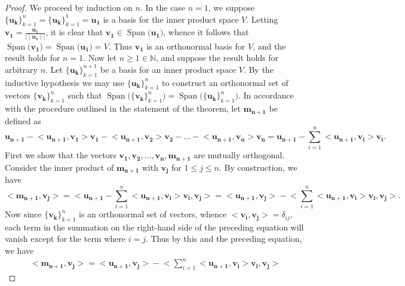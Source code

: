 \documentclass[12pt]{article}
\theoremstyle{plain}
\DeclareMathOperator{\spn}{Span}
\begin{document}
\begin{proof}
We proceed by induction on $n$. In the case $n=1$, we suppose 
$\{\mathbf{u_k}\}_{k=1}^n=\{\mathbf{u_k}\}_{k=1}^1=\mathbf{u_1}$ is a basis for the inner product space $V$. Letting $\mathbf{v_1}=\tfrac{\mathbf{u_1}}{\mid\mid\mathbf{u_1}\mid\mid}$, it is clear that $\mathbf{v_1}\in \spn\big(\mathbf{u_1}\big)$, whence it follows that $\spn\big(\mathbf{v_1}\big)=\spn\big(\mathbf{u_1}\big)=V$. Thus $\mathbf{v_1}$ is an orthonormal basis for $V$, and the result holds for $n=1$. Now let $n\geq 1\in\mathbb{N}$, and suppose the result holds for arbitrary $n$. Let $\{\mathbf{u_k}\}_{k=1}^{n+1}$ be a basis for an inner product space $V$. By the inductive hypothesis we may use $\{\mathbf{u_k}\}_{k=1}^n$ to construct an orthonormal set of vectors $\{\mathbf{v_k}\}_{k=1}^n$ such that $\spn\big(\{\mathbf{v_k}\}_{k=1}^n\big)=\spn\big(\{\mathbf{u_k}\}_{k=1}^n\big)$. In accordance with the procedure outlined in the statement of the theorem, let $\mathbf{m_{n+1}}$ be defined as
\begin{equation*}
\mathbf{u_{n+1}}-
\big<\mathbf{u_{n+1}},\mathbf{v_1}\big>\mathbf{v_1}
-\big<\mathbf{u_{n+1}},\mathbf{v_2}\big>\mathbf{v_2}
-\ldots
-\big<\mathbf{u_{n+1}},\mathbf{v_n}\big>\mathbf{v_n}
=\mathbf{u_{n+1}}-\sum\limits_{i=1}^n \big<\mathbf{u_{n+1}},\mathbf{v_i}\big>\mathbf{v_i}\text{.}
\end{equation*}
First we show that the vectors $\mathbf{v_1},\mathbf{v_2},\ldots,\mathbf{v_n},\mathbf{m_{n+1}}$ are mutually orthogonal.
Consider the inner product of 
$\mathbf{m_{n+1}}$ with $\mathbf{v_j}$ for $1\leq j\leq n$. By construction, we have
\begin{equation*}
\big<\mathbf{m_{n+1}},\mathbf{v_j}\big>=\biggl<\mathbf{u_{n+1}}
-\sum_{i=1}^n\big<\mathbf{u_{n+1}},
\mathbf{v_i}\big>\mathbf{v_i},\mathbf{v_j}\biggr>
=\big<\mathbf{u_{n+1}},\mathbf{v_j}\big>
-\biggl<\sum\limits_{i=1}^n\big<\mathbf{u_{n+1}},\mathbf{v_i}\big>
\mathbf{v_i},\mathbf{v_j}\biggr>\text{.}
\end{equation*}
Now since $\{\mathbf{v_k}\}_{k=1}^n$ is an orthonormal set of vectors, whence
$\big<\mathbf{v_i},\mathbf{v_j}\big>=\delta_{ij}$, each term in the summation on the right-hand side of the preceding equation will vanish except for the term where $i=j$. Thus by this and the preceding equation, we have
\begin{multline*}
\big<\mathbf{m_{n+1}},\mathbf{v_j}\big>
=\big<\mathbf{u_{n+1}},\mathbf{v_j}\big>
-\biggl<\sum\limits_{i=1}^n\big<\mathbf{u_{n+1}},\mathbf{v_i}\big>
\mathbf{v_i},\mathbf{v_j}\biggr>

\end{multline*}
\end{proof}
\end{document}
